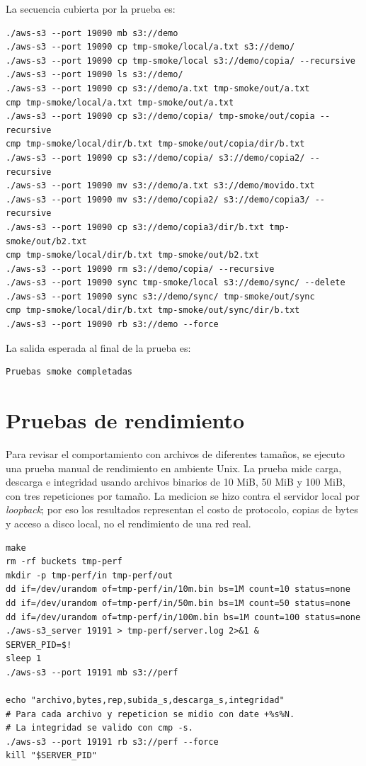 \documentclass[12pt,letterpaper]{article}
\begin{document}
La secuencia cubierta por la prueba es:

\begin{lstlisting}[style=console]
./aws-s3 --port 19090 mb s3://demo
./aws-s3 --port 19090 cp tmp-smoke/local/a.txt s3://demo/
./aws-s3 --port 19090 cp tmp-smoke/local s3://demo/copia/ --recursive
./aws-s3 --port 19090 ls s3://demo/
./aws-s3 --port 19090 cp s3://demo/a.txt tmp-smoke/out/a.txt
cmp tmp-smoke/local/a.txt tmp-smoke/out/a.txt
./aws-s3 --port 19090 cp s3://demo/copia/ tmp-smoke/out/copia --recursive
cmp tmp-smoke/local/dir/b.txt tmp-smoke/out/copia/dir/b.txt
./aws-s3 --port 19090 cp s3://demo/copia/ s3://demo/copia2/ --recursive
./aws-s3 --port 19090 mv s3://demo/a.txt s3://demo/movido.txt
./aws-s3 --port 19090 mv s3://demo/copia2/ s3://demo/copia3/ --recursive
./aws-s3 --port 19090 cp s3://demo/copia3/dir/b.txt tmp-smoke/out/b2.txt
cmp tmp-smoke/local/dir/b.txt tmp-smoke/out/b2.txt
./aws-s3 --port 19090 rm s3://demo/copia/ --recursive
./aws-s3 --port 19090 sync tmp-smoke/local s3://demo/sync/ --delete
./aws-s3 --port 19090 sync s3://demo/sync/ tmp-smoke/out/sync
cmp tmp-smoke/local/dir/b.txt tmp-smoke/out/sync/dir/b.txt
./aws-s3 --port 19090 rb s3://demo --force
\end{lstlisting}

La salida esperada al final de la prueba es:

\begin{lstlisting}[style=console]
Pruebas smoke completadas
\end{lstlisting}

\section{Pruebas de rendimiento}

Para revisar el comportamiento con archivos de diferentes tama\~{n}os, se ejecuto una
prueba manual de rendimiento en ambiente Unix. La prueba mide carga, descarga e
integridad usando archivos binarios de 10 MiB, 50 MiB y 100 MiB, con tres
repeticiones por tama\~{n}o. La medicion se hizo contra el servidor local por
\textit{loopback}; por eso los resultados representan el costo de protocolo,
copias de bytes y acceso a disco local, no el rendimiento de una red real.

\begin{lstlisting}[style=console]
make
rm -rf buckets tmp-perf
mkdir -p tmp-perf/in tmp-perf/out
dd if=/dev/urandom of=tmp-perf/in/10m.bin bs=1M count=10 status=none
dd if=/dev/urandom of=tmp-perf/in/50m.bin bs=1M count=50 status=none
dd if=/dev/urandom of=tmp-perf/in/100m.bin bs=1M count=100 status=none
./aws-s3_server 19191 > tmp-perf/server.log 2>&1 &
SERVER_PID=$!
sleep 1
./aws-s3 --port 19191 mb s3://perf

echo "archivo,bytes,rep,subida_s,descarga_s,integridad"
# Para cada archivo y repeticion se midio con date +%s%N.
# La integridad se valido con cmp -s.
./aws-s3 --port 19191 rb s3://perf --force
kill "$SERVER_PID"
\end{lstlisting}
\end{document}
